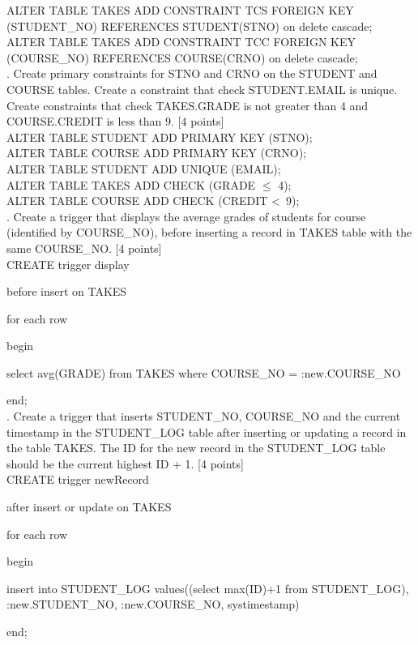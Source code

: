 \documentclass[]{article}
\begin{document}
	ALTER TABLE TAKES ADD CONSTRAINT TCS FOREIGN KEY (STUDENT\_NO) REFERENCES STUDENT(STNO)
		on delete cascade;  \\
	
	ALTER TABLE TAKES ADD CONSTRAINT TCC FOREIGN KEY (COURSE\_NO) REFERENCES COURSE(CRNO)
		on delete cascade;  \\
	
	. Create primary constraints for STNO and CRNO on the STUDENT and COURSE tables. Create a constraint that check STUDENT.EMAIL is unique. Create constraints that check TAKES.GRADE is not greater than 4 and COURSE.CREDIT is less than 9. [4 points]   \\
	
	ALTER TABLE STUDENT ADD PRIMARY KEY (STNO);  \\
	
	ALTER TABLE COURSE ADD PRIMARY KEY (CRNO);  \\
	
	ALTER TABLE STUDENT ADD UNIQUE (EMAIL);   \\
	
	ALTER TABLE TAKES ADD CHECK (GRADE $\leq$ 4);   \\
	
	ALTER TABLE COURSE ADD CHECK (CREDIT \textless\  9);   \\
	
	. Create a trigger that displays the average grades of students for course (identified by COURSE\_NO), before inserting a record in TAKES table with the same COURSE\_NO. [4 points]   \\
	
	CREATE trigger display
	
	before insert on TAKES
	
	for each row
	
	begin
	
	select avg(GRADE) from TAKES where COURSE\_NO = :new.COURSE\_NO
	
	end; \\
	
	. Create a trigger that inserts STUDENT\_NO, COURSE\_NO and the current timestamp in the STUDENT\_LOG table after inserting or updating a record in the table TAKES. The ID for the new record in the STUDENT\_LOG table should be the current highest ID + 1. [4 points]   \\
	
	CREATE trigger newRecord
	
	after insert or update on TAKES
	
	for each row
	
	begin
	
	insert into STUDENT\_LOG 
	values((select max(ID)+1 from STUDENT\_LOG), :new.STUDENT\_NO, :new.COURSE\_NO, systimestamp)
	
	end; \\
	
\end{document}
